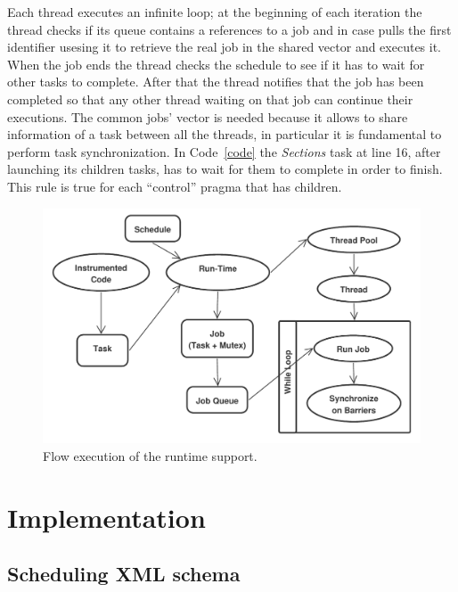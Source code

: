 \documentclass[a4paper,11pt,oneside]{book}
\begin{document}
Each thread executes an infinite loop; at the beginning of each iteration the thread checks if its queue contains a references to a job and in case pulls the first identifier usesing it to retrieve the real job in the shared vector and executes it. When the job ends the thread checks the schedule to see if it has to wait for other tasks to complete. After that the thread notifies that the job has been completed so that any other thread waiting on that job can continue their executions. The common jobs’ vector is needed because it allows to share information of a task between all the threads, in particular it is fundamental to perform task synchronization. In Code~\ref{code} the \emph{Sections} task at line 16, after launching its children tasks, has to wait for them to complete in order to finish. This rule is true for each “control” pragma that has children. 

\begin{figure}[H]
\centering
\includegraphics[scale=0.6]{runtime_execution.pdf}
\caption{Flow execution of the runtime support.}
\end{figure}


\chapter{Implementation}
\section{Scheduling XML schema}
\label{schedulexmlschema}
\end{document}
